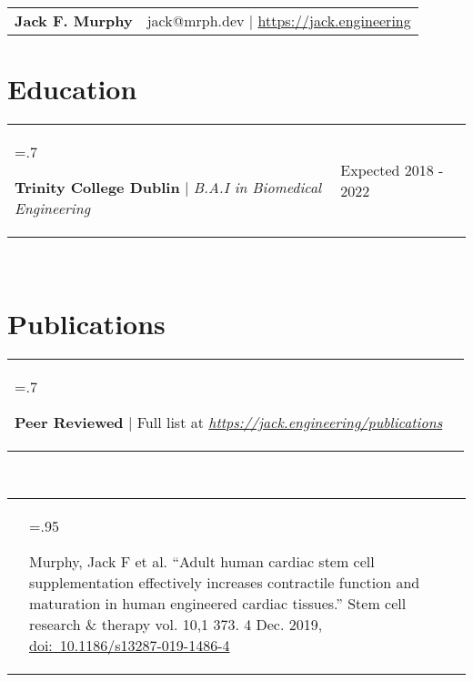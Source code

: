 \documentclass[letterpaper,11pt]{article}
\newcommand{\projHeadings}[2]{
    \begin{tabularx}{\textwidth} {>{\hsize=.7\textwidth\raggedright\arraybackslash}X 
   >{\raggedleft\arraybackslash}X}
      #1 & \small#2 \\
    \end{tabularx}
    \\
}
\newcommand{\projitems}[1]{
    \begin{tabularx}{\textwidth} {>{\raggedleft\arraybackslash}X | >{\hsize=.95\textwidth\raggedright\arraybackslash}X}
      & \small#1 \\
    \end{tabularx}
     \\
}
\newcommand{\heading}[3]{
    \hspace{-9mm}
    \begin{tabular}{p{.4\textwidth} >{\raggedleft}p{.57\textwidth}}
        \textbf{\Huge{#1}}\vspace{5mm} & #2 $|$ #3 \\
    \end{tabular}
}
\begin{document}
\heading
    {Jack F. Murphy}
    {jack@mrph.dev}
    {\href{https://jack.engineering}{https://jack.engineering}}

\section*{Education}
    \projHeadings
          {\textbf{Trinity College Dublin} $|$ \emph{B.A.I in Biomedical Engineering}}
          {Expected 2018 - 2022}
          {}

\section*{Publications}
    \projHeadings
          {\textbf{Peer Reviewed} $|$ Full list at \emph{\href{https://jack.engineering/publications}{https://jack.engineering/publications}}}
          {}
         \projitems
            {Murphy, Jack F et al. “Adult human cardiac stem cell supplementation effectively increases contractile function and maturation in human engineered cardiac tissues.” Stem cell research \& therapy vol. 10,1 373. 4 Dec. 2019, \href{https://doi.org/10.1186/s13287-019-1486-4}{doi:~10.1186/s13287-019-1486-4}
            }

\end{document}
